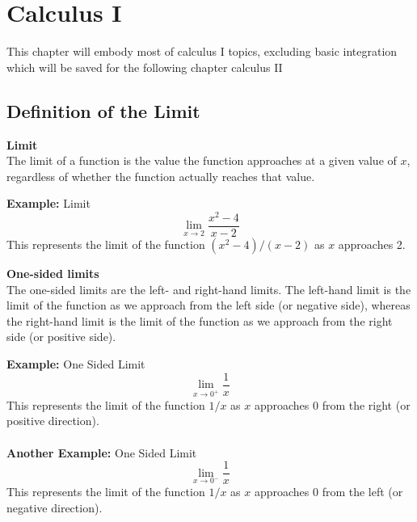 \chapter{Calculus I}

\noindent This chapter will embody most of calculus I topics, excluding 
basic integration which will be saved for the following chapter calculus II

\section{Definition of the Limit}
\noindent \textbf{Limit}\\
The limit of a function is the value the function approaches at a given value of
$x$, regardless of whether the function actually reaches that value.

\begin{framed}
  \noindent \textbf{Example:} Limit
  \begin{equation*}
    \lim_{x \to 2} \frac{x^2 - 4}{x - 2}
  \end{equation*}
  \noindent This represents the limit of the function $(x^2 - 4)/(x - 2)$ as $x$ 
            approaches 2.
\end{framed}

\noindent \textbf{One-sided limits}\\
The one-sided limits are the left- and right-hand limits. The left-hand limit is 
the limit of the function as we approach from the left side (or negative side), 
whereas the right-hand limit is the limit of the function as we approach from 
the right side (or positive side).

\begin{framed}
  \noindent \textbf{Example:} One Sided Limit
  \begin{equation*}
    \lim_{x \to 0^+} \frac{1}{x}
  \end{equation*}
  \noindent This represents the limit of the function $1/x$ as $x$ approaches 0 
  from the right (or positive direction).\\\\ 

  \noindent \textbf{Another Example:} One Sided Limit
  \begin{equation*}
    \lim_{x \to 0^-} \frac{1}{x}
  \end{equation*}
  \noindent This represents the limit of the function $1/x$ as $x$ approaches 0 
  from the left (or negative direction).
\end{framed}

